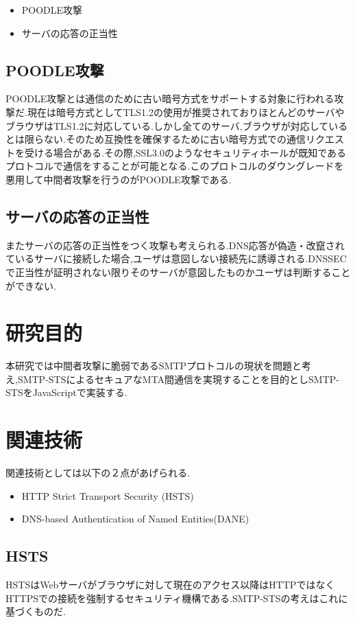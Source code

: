 \documentclass[a4j,10pt]{jsarticle}
\begin{document}
\begin{itemize}
\item POODLE攻撃 
\item サーバの応答の正当性
\end{itemize}

\subsection{POODLE攻撃}
POODLE攻撃とは通信のために古い暗号方式をサポートする対象に行われる攻撃だ.現在は暗号方式としてTLS1.2の使用が推奨されておりほとんどのサーバやブラウザはTLS1.2に対応している.しかし全てのサーバ,ブラウザが対応しているとは限らない.そのため互換性を確保するために古い暗号方式での通信リクエストを受ける場合がある.その際,SSL3.0のようなセキュリティホールが既知であるプロトコルで通信をすることが可能となる.このプロトコルのダウングレードを悪用して中間者攻撃を行うのがPOODLE攻撃である.

\subsection{サーバの応答の正当性}
またサーバの応答の正当性をつく攻撃も考えられる.DNS応答が偽造・改竄されているサーバに接続した場合,ユーザは意図しない接続先に誘導される.DNSSECで正当性が証明されない限りそのサーバが意図したものかユーザは判断することができない.


\section{研究目的}

本研究では中間者攻撃に脆弱であるSMTPプロトコルの現状を問題と考え,SMTP-STSによるセキュアなMTA間通信を実現することを目的としSMTP-STSをJavaScriptで実装する.



\section{関連技術}

関連技術としては以下の２点があげられる.
\begin{itemize}
\item HTTP Strict Transport Security (HSTS)
\item DNS-based Authentication of Named Entities(DANE)
\end{itemize}

\subsection{HSTS}
HSTSはWebサーバがブラウザに対して現在のアクセス以降はHTTPではなくHTTPSでの接続を強制するセキュリティ機構である.SMTP-STSの考えはこれに基づくものだ.
\end{document}
